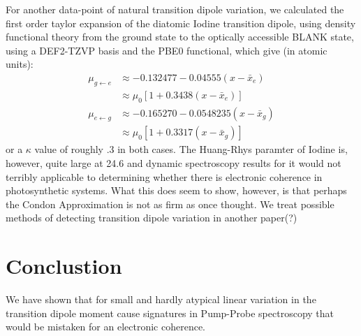 For another data-point of natural transition dipole variation, we calculated\cite{turbomolSoftware,Rappaport2005} the first order taylor expansion of the diatomic Iodine transition dipole, using density functional theory \cite{dft} from the ground state to the optically accessible BLANK state, using a DEF2-TZVP basis\cite{dftBasis} and the PBE0 functional\cite{dftFunctional}, which give (in atomic units):
\begin{align}
	\mu_{g \leftarrow e} &\approx -0.132477 - 0.04555 (x - \bar{x}_e )\\
	&\approx \mu_0 \left[ 1 + 0.3438(x - \bar{x}_e ) \right]\\
	\mu_{e \leftarrow g} &\approx -0.165270 - 0.0548235 (x - \bar{x}_g) \\
	&\approx \mu_0 \left[ 1 + 0.3317(x - \bar{x}_g ) \right]
\end{align}
or a $\kappa$ value of roughly .3 in both cases.  The Huang-Rhys paramter of Iodine is, however, quite large at 24.6 and dynamic spectroscopy results for it would not terribly applicable to determining whether there is electronic coherence in photosynthetic systems.  What this does seem to show, however, is that perhaps the Condon Approximation is not as firm as once thought.  We treat possible methods of detecting transition dipole variation in another paper(?)

\section{Conclustion}
We have shown that for small and hardly atypical linear variation in the transition dipole moment cause signatures in Pump-Probe spectroscopy that would be mistaken for an electronic coherence.
